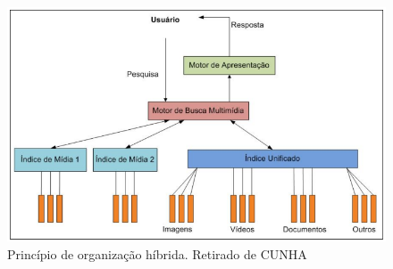 \documentclass[12pt]{article}
\begin{document}
\begin{figure}[H]
    \centering
    \includegraphics[width=0.7\linewidth]{figure_3.png}
    \caption{Princípio de organização híbrida. Retirado de CUNHA\cite{cunha}}
\end{figure}

\nocite{*}
\medskip



\end{document}
